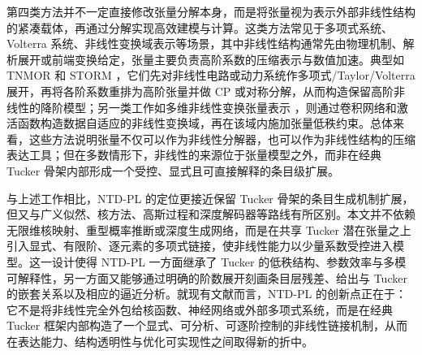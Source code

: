 第四类方法并不一定直接修改张量分解本身，而是将张量视为表示外部非线性结构的紧凑载体，再通过分解实现高效建模与计算。这类方法常见于多项式系统、Volterra 系统、非线性变换域表示等场景，其中非线性结构通常先由物理机制、解析展开或前端变换给定，张量主要负责高阶系数的压缩表示与数值加速。典型如 TNMOR 和 STORM \cite{liu2015model,deng2016storm}，它们先对非线性电路或动力系统作多项式/Taylor/Volterra 展开，再将各阶系数重排为高阶张量并做 CP 或对称分解，从而构造保留高阶非线性的降阶模型；另一类工作如多维非线性变换张量表示 \cite{shi2025multidimensional}，则通过卷积网络和激活函数构造数据自适应的非线性变换域，再在该域内施加张量低秩约束。总体来看，这些方法说明张量不仅可以作为非线性分解器，也可以作为非线性结构的压缩表达工具；但在多数情形下，非线性的来源位于张量模型之外，而非在经典 Tucker 骨架内部形成一个受控、显式且可直接解释的条目级扩展。

与上述工作相比，NTD-PL 的定位更接近保留 Tucker 骨架的条目生成机制扩展，但又与广义似然、核方法、高斯过程和深度解码器等路线有所区别。本文并不依赖无限维核映射、重型概率推断或深度生成网络，而是在共享 Tucker 潜在张量之上引入显式、有限阶、逐元素的多项式链接，使非线性能力以少量系数受控进入模型。这一设计使得 NTD-PL 一方面继承了 Tucker 的低秩结构、参数效率与多模可解释性，另一方面又能够通过明确的阶数展开刻画条目层残差、给出与 Tucker 的嵌套关系以及相应的逼近分析。就现有文献而言，NTD-PL 的创新点正在于：它不是将非线性完全外包给核函数、神经网络或外部多项式系统，而是在经典 Tucker 框架内部构造了一个显式、可分析、可逐阶控制的非线性链接机制，从而在表达能力、结构透明性与优化可实现性之间取得新的折中。
